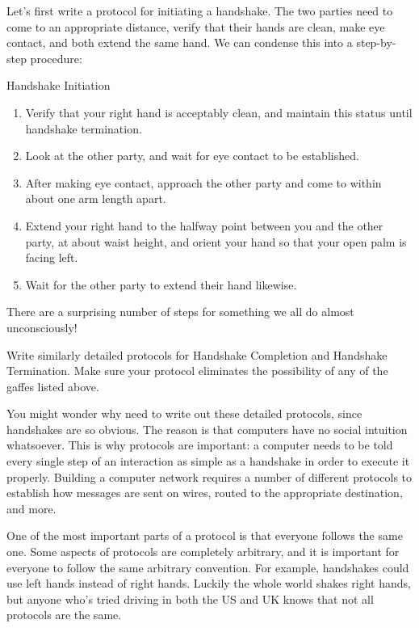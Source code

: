 Let's first write a protocol for initiating a handshake. The two parties need to come to an appropriate distance, verify that their hands are clean, make eye contact, and both extend the same hand. We can condense this into a step-by-step procedure:

\begin{graybox}
{\Large Handshake Initiation}
\begin{enumerate}
    \item Verify that your right hand is acceptably clean, and maintain this status until handshake termination.
    \item Look at the other party, and wait for eye contact to be established.
    \item After making eye contact, approach the other party and come to within about one arm length apart.
    \item Extend your right hand to the halfway point between you and the other party, at about waist height, and orient your hand so that your open palm is facing left.
    \item Wait for the other party to extend their hand likewise.
\end{enumerate}
\end{graybox}

There are a surprising number of steps for something we all do almost unconsciously! 

\begin{exercise}
    Write similarly detailed protocols for Handshake Completion and Handshake Termination. Make sure your protocol eliminates the possibility of any of the gaffes listed above.
\end{exercise}

You might wonder why need to write out these detailed protocols, since handshakes are so obvious. The reason is that computers have no social intuition whatsoever. This is why protocols are important: a computer needs to be told every single step of an interaction as simple as a handshake in order to execute it properly. Building a computer network requires a number of different protocols to establish how messages are sent on wires, routed to the appropriate destination, and more.

One of the most important parts of a protocol is that everyone follows the same one. Some aspects of protocols are completely arbitrary, and it is important for everyone to follow the same arbitrary convention. For example, handshakes could use left hands instead of right hands. Luckily the whole world shakes right hands, but anyone who's tried driving in both the US and UK knows that not all protocols are the same.

